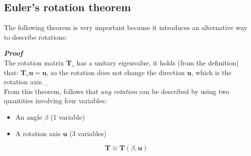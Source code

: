 \subsection{Euler's rotation theorem}
The following theorem is very important because it introduces an alternative way to describe rotations: \\

\hspace*{-5mm}
%

\vspace{0.5cm}
\noindent
\textbf{\textit{Proof}}\\
The rotation matrix $\mathbf{T}_{\diamond}$ has a unitary eigenvalue, it holds (from the definition) that: $\mathbf{T}_{\diamond}\mathbf{u}=\mathbf{u}$, so the rotation does not change the direction $\mathbf{u}$, which is the rotation axis. $_\square$\\

From this theorem, follows that \textit{any rotation} can be described by using two quantities involving four variables: 
\begin{itemize}
    \itemsep0em
    \item[\ding{70}] An angle $\beta$ (1 variable)
    \item[\ding{70}] A rotation axis $\mathbf{u}$ (3 variables)
\end{itemize}
{
\huge{
\begin{equation*}
    \mathbf{T} \equiv \mathbf{T}(\beta, \mathbf{u})
\end{equation*}}
}

